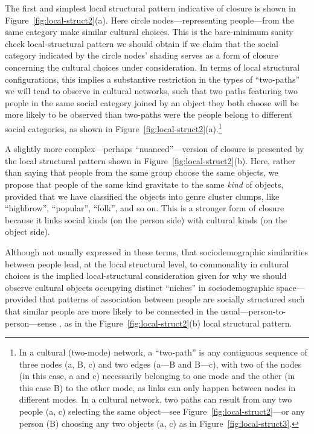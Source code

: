 \documentclass[preprint,12pt,authoryear]{elsarticle}
\begin{document}
The first and simplest local structural pattern indicative of closure is shown in Figure~\ref{fig:local-struct2}(a). Here circle nodes---representing people---from the same category make similar cultural choices. This is the bare-minimum sanity check local-structural pattern we should obtain if we claim that the social category indicated by the circle nodes' shading serves as a form of closure concerning the cultural choices under consideration. In terms of local structural configurations, this implies a substantive restriction in the types of ``two-paths'' we will tend to observe in cultural networks, such that two paths featuring two people in the same social category joined by an object they both choose will be more likely to be observed than two-paths were the people belong to different social categories, as shown in Figure~\ref{fig:local-struct2}(a).\footnote{In a cultural (two-mode) network, a ``two-path'' is any contiguous sequence of three nodes (a, B, c) and two edges (a---B and B---c), with two of the nodes (in this case, a and c) necessarily belonging to one mode and the other (in this case B) to the other mode, as links can only happen between nodes in different modes. In a cultural network, two paths can result from  any two people (a, c) selecting the same object---see Figure~\ref{fig:local-struct2}---or any person (B) choosing any two objects (a, c) as in Figure~\ref{fig:local-struct3}.}

A slightly more complex---perhaps ``nuanced''---version of closure is presented by the local structural pattern shown in Figure~\ref{fig:local-struct2}(b). Here, rather than saying that people from the same group choose the same objects, we propose that people of the same kind gravitate to the same \textit{kind} of objects, provided that we have classified the objects into genre cluster clumps, like ``highbrow'', ``popular'', ``folk'', and so on. This is a stronger form of closure because it links social kinds (on the person side) with cultural kinds (on the object side).

Although not usually expressed in these terms, that sociodemographic similarities between people lead, at the local structural level, to commonality in cultural choices is the implied local-structural consideration given for why we should observe cultural objects occupying distinct ``niches'' in sociodemographic space---provided that patterns of association between people are socially structured such that similar people are more likely to be connected in the usual---person-to-person---sense \citep{mark2003culture, dellaposta2015liberals}, as in the Figure~\ref{fig:local-struct2}(b) local structural pattern.
\end{document}

